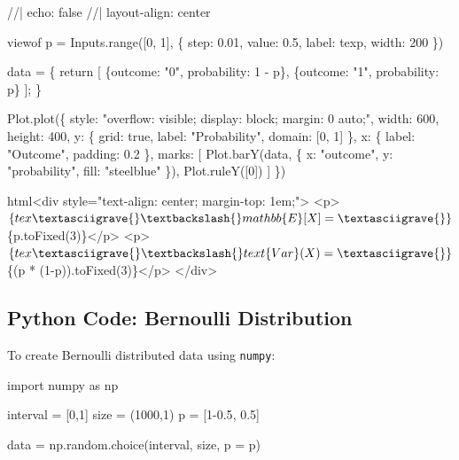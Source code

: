 \documentclass[
  letterpaper,
  DIV=11,
  numbers=noendperiod]{scrreprt}
\newenvironment{Shaded}{\begin{snugshade}}{\end{snugshade}}
\newcommand{\DecValTok}[1]{\textcolor[rgb]{0.68,0.00,0.00}{#1}}
\newcommand{\FloatTok}[1]{\textcolor[rgb]{0.68,0.00,0.00}{#1}}
\newcommand{\ImportTok}[1]{\textcolor[rgb]{0.00,0.46,0.62}{#1}}
\newcommand{\NormalTok}[1]{\textcolor[rgb]{0.00,0.23,0.31}{#1}}
\newcommand{\OperatorTok}[1]{\textcolor[rgb]{0.37,0.37,0.37}{#1}}
\begin{document}
\label{observable}
\begin{Shaded}
\begin{Highlighting}[]
\NormalTok{//| echo: false}
\NormalTok{//| layout{-}align: center}

\NormalTok{viewof p = Inputs.range([0, 1], \{}
\NormalTok{  step: 0.01,}
\NormalTok{  value: 0.5,}
\NormalTok{  label: tex\textasciigrave{}p\textasciigrave{},}
\NormalTok{  width: 200}
\NormalTok{\})}

\NormalTok{data = \{}
\NormalTok{  return [}
\NormalTok{    \{outcome: "0", probability: 1 {-} p\},}
\NormalTok{    \{outcome: "1", probability: p\}}
\NormalTok{  ];}
\NormalTok{\}}

\NormalTok{Plot.plot(\{}
\NormalTok{  style: "overflow: visible; display: block; margin: 0 auto;",}
\NormalTok{  width: 600,}
\NormalTok{  height: 400,}
\NormalTok{  y: \{}
\NormalTok{    grid: true,}
\NormalTok{    label: "Probability",}
\NormalTok{    domain: [0, 1]}
\NormalTok{  \},}
\NormalTok{  x: \{}
\NormalTok{    label: "Outcome",}
\NormalTok{    padding: 0.2}
\NormalTok{  \},}
\NormalTok{  marks: [}
\NormalTok{    Plot.barY(data, \{}
\NormalTok{      x: "outcome",}
\NormalTok{      y: "probability",}
\NormalTok{      fill: "steelblue"}
\NormalTok{    \}),}
\NormalTok{    Plot.ruleY([0])}
\NormalTok{  ]}
\NormalTok{\})}

\NormalTok{html\textasciigrave{}\textless{}div style="text{-}align: center; margin{-}top: 1em;"\textgreater{}}
\NormalTok{  \textless{}p\textgreater{}$\{tex\textasciigrave{}\textbackslash{}mathbb\{E\}[X] =\textasciigrave{}\} $\{p.toFixed(3)\}\textless{}/p\textgreater{}}
\NormalTok{  \textless{}p\textgreater{}$\{tex\textasciigrave{}\textbackslash{}text\{Var\}(X) =\textasciigrave{}\} $\{(p * (1{-}p)).toFixed(3)\}\textless{}/p\textgreater{}}
\NormalTok{\textless{}/div\textgreater{}\textasciigrave{}}
\end{Highlighting}
\end{Shaded}

\subsection{Python Code: Bernoulli
Distribution}\label{python-code-bernoulli-distribution}

To create Bernoulli distributed data using \texttt{numpy}:

\begin{Shaded}
\begin{Highlighting}[]
\ImportTok{import}\NormalTok{ numpy }\ImportTok{as}\NormalTok{ np}

\NormalTok{interval }\OperatorTok{=}\NormalTok{ [}\DecValTok{0}\NormalTok{,}\DecValTok{1}\NormalTok{]}
\NormalTok{size }\OperatorTok{=}\NormalTok{ (}\DecValTok{1000}\NormalTok{,}\DecValTok{1}\NormalTok{)}
\NormalTok{p }\OperatorTok{=}\NormalTok{ [}\DecValTok{1}\OperatorTok{{-}}\FloatTok{0.5}\NormalTok{, }\FloatTok{0.5}\NormalTok{]}

\NormalTok{data }\OperatorTok{=}\NormalTok{ np.random.choice(interval, size, p }\OperatorTok{=}\NormalTok{ p)}
\end{Highlighting}
\end{Shaded}
\end{document}
